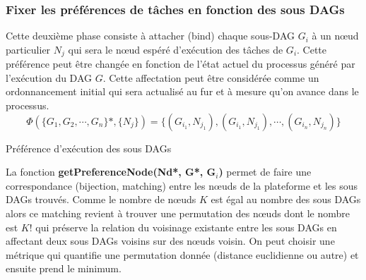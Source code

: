 \subsubsection{Fixer les préférences de tâches en fonction des sous DAGs}
%
Cette deuxième phase consiste à attacher (bind) chaque sous-DAG $G_i$ à un nœud particulier $N_j$ qui sera le nœud espéré d'exécution  des tâches de $G_i$. Cette préférence peut être changée en fonction de l'état actuel du processus généré par l'exécution du DAG $G$.
Cette affectation peut être considérée comme un ordonnancement initial qui  sera actualisé au fur et à mesure qu'on avance dans le processus.
%
$$
\Phi(\{ G_1, G_2, \cdots , G_n\}*, \{N_j\}) = \{(G_{i_1},N_{j_1}), (G_{i_1},N_{j_1}), \cdots, (G_{i_n},N_{j_n}) \}
$$
\begin{algorithm}
\DontPrintSemicolon
\SetNoFillComment %

%

\BlankLine 

\caption{Préférence d'exécution des sous DAGs}
\end{algorithm}              %
La fonction \textbf{getPreferenceNode(Nd*, G*, G$_i$)} permet de faire une correspondance (bijection, matching) entre les nœuds de la plateforme et les sous DAGs trouvés. Comme le nombre de nœuds $K$ est égal au nombre des sous DAGs alors ce matching revient à trouver une permutation des nœuds dont le nombre est $K!$ qui préserve la relation du voisinage existante entre les sous DAGs en affectant deux sous DAGs voisins sur des nœuds voisin. On peut choisir une métrique qui quantifie une permutation donnée (distance euclidienne ou autre) et ensuite prend le minimum. 
%
